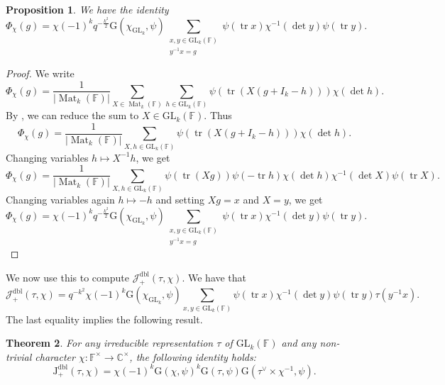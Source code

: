 \documentclass[12pt, reqno]{amsart}
\newtheorem{theorem}{Theorem}[section]
\newtheorem{proposition}[theorem]{Proposition}
\theoremstyle{definition}
\theoremstyle{definition}
\theoremstyle{definition}
\newcommand{\cComplex}{\mathbb{C}}
\newcommand{\multiplicativegroup}[1]{#1^{\times}}
\newcommand{\sizeof}[1]{\left|#1\right|}
\newcommand{\fieldCharacter}{\psi}
\newcommand{\IdentityMatrix}[1]{I_{#1}}
\newcommand{\trace}{\operatorname{tr}}
\newcommand{\GL}{\mathrm{GL}}
\newcommand{\finiteField}{\mathbb{F}}
\newcommand{\squareMatrix}{\operatorname{Mat}}
\newcommand{\posDblJacobiSum}[2]{\mathcal{J}_{+}^{\mathrm{dbl}}\left(#1, #2\right)}
\newcommand{\GaussSumScalar}[2]{\mathrm{G}\left(#1, #2\right)}
\newcommand{\posDblJacobiSumScalar}[2]{\mathrm{J}_{+}^{\mathrm{dbl}}\left(#1, #2\right)}
\begin{document}
\begin{proposition}\label{prop:doubling-for-gln-in-terms-of-kondo}
	We have the identity
	$$\Phi_{\chi}\left(g\right) = \chi\left(-1\right)^k q^{-\frac{k^2}{2}} \GaussSumScalar{\chi_{\GL_k}}{\fieldCharacter} \sum_{\substack{x, y \in \GL_k\left(\finiteField\right)\\
			y^{-1} x = g}} \fieldCharacter\left(\trace x\right) \chi^{-1}\left(\det y\right) \fieldCharacter\left(\trace y\right).$$
\end{proposition}
\begin{proof}
	We write $$\Phi_{\chi}\left(g\right) = \frac{1}{\sizeof{\squareMatrix_k\left(\finiteField\right)}}\sum_{X \in \squareMatrix_k\left(\finiteField\right)} \sum_{h \in \GL_k\left(\finiteField\right)} \fieldCharacter\left(\trace \left(X\left(g+\IdentityMatrix{k}-h\right)\right)\right) \chi\left(\det h\right).$$
	By , we can reduce the sum to $X \in \GL_k\left(\finiteField\right)$. Thus	$$\Phi_{\chi}\left(g\right) = \frac{1}{\sizeof{\squareMatrix_k\left(\finiteField\right)}} \sum_{X, h \in \GL_k\left(\finiteField\right)} \fieldCharacter\left(\trace \left(X\left(g+\IdentityMatrix{k}-h\right)\right)\right) \chi\left(\det h\right).$$
	Changing variables $h \mapsto X^{-1} h$, we get
	$$\Phi_{\chi}\left(g\right) = \frac{1}{\sizeof{\squareMatrix_k\left(\finiteField\right)}} \sum_{X, h \in \GL_k\left(\finiteField\right)} \fieldCharacter\left(\trace \left(Xg\right)\right) \fieldCharacter\left(-\trace h\right) \chi\left(\det h\right) \chi^{-1}\left(\det X\right) \fieldCharacter\left(\trace X\right).$$
	Changing variables again $h \mapsto -h$ and setting $Xg = x$ and $X = y$, we get  
	$$\Phi_{\chi}\left(g\right) = \chi\left(-1\right)^k q^{-\frac{k^2}{2}} \GaussSumScalar{\chi_{\GL_k}}{\fieldCharacter} \sum_{\substack{x, y \in \GL_k\left(\finiteField\right)\\
			y^{-1} x = g}} \fieldCharacter\left(\trace x\right) \chi^{-1}\left(\det y\right) \fieldCharacter\left(\trace y\right).$$
\end{proof}

We now use this to compute $\posDblJacobiSum{\tau}{\chi}$. We have that $$\posDblJacobiSum{\tau}{\chi} = q^{-k^2} \chi\left(-1\right)^k \GaussSumScalar{\chi_{\GL_k}}{\fieldCharacter} \sum_{x, y \in \GL_k\left(\finiteField\right)} \fieldCharacter\left(\trace x\right) \chi^{-1}\left(\det y\right) \fieldCharacter\left(\trace y\right) \tau\left(y^{-1} x\right).$$
The last equality implies the following result.
\begin{theorem}\label{thm:gln-doubling-gauss-sum-in-terms-of-kondo}For any irreducible representation $\tau$ of $\GL_k\left(\finiteField\right)$ and any non-trivial character $\chi \colon \multiplicativegroup{\finiteField} \to \multiplicativegroup{\cComplex}$, the following identity holds:
	$$\posDblJacobiSumScalar{\tau}{\chi} = \chi\left(-1\right)^k \GaussSumScalar{\chi}{\fieldCharacter}^k \GaussSumScalar{\tau}{\fieldCharacter} \GaussSumScalar{\tau^{\vee} \times \chi^{-1}}{\fieldCharacter}.$$
\end{theorem}
\end{document}
